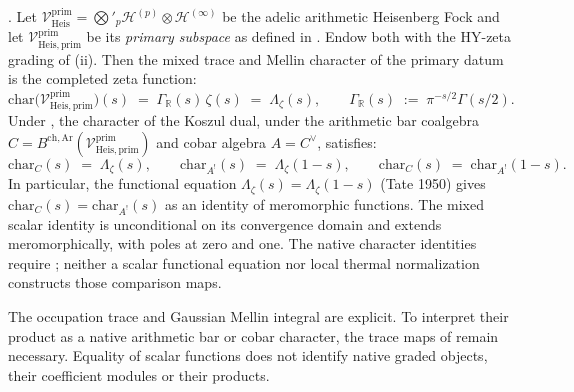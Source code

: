 \begin{theorem}
\label{v4-arith:prim-zeta:thm:main}
\ClaimStatusProvedHere. Let
\(\mathcal{V}^{\mathrm{prim}}_{\mathrm{Heis}}=\bigotimes'_{p}\mathcal{H}^{(p)}\otimes\mathcal{H}^{(\infty)}\)
be the adelic arithmetic Heisenberg Fock and let
\(\mathcal{V}^{\mathrm{prim}}_{\mathrm{Heis},\mathrm{prim}}\) be its
\emph{primary subspace} as defined in
. Endow both with the
HY-zeta grading of
(ii). Then the mixed trace and Mellin character of
the primary datum is the completed zeta function:
\begin{equation}
\label{v4-arith:prim-zeta:eq:main}
\mathrm{char}\bigl(\mathcal{V}^{\mathrm{prim}}_{\mathrm{Heis},\mathrm{prim}}\bigr)(s)
\;=\;\Gamma_{\mathbb{R}}(s)\,\zeta(s)
\;=\;\Lambda_{\zeta}(s),
\qquad
\Gamma_{\mathbb{R}}(s)\;:=\;\pi^{-s/2}\Gamma(s/2).
\end{equation}
Under , the
character of the Koszul dual, under the arithmetic bar
coalgebra \(C=B^{\mathrm{ch,Ar}}(\mathcal{V}^{\mathrm{prim}}_{\mathrm{Heis},\mathrm{prim}})\)
and cobar algebra \(A=C^{\vee}\), satisfies:
\begin{equation}
\label{v4-arith:prim-zeta:eq:koszul-dual}
\mathrm{char}_{C}(s)\;=\;\Lambda_{\zeta}(s),
\qquad
\mathrm{char}_{A^{!}}(s)\;=\;\Lambda_{\zeta}(1-s),
\qquad
\mathrm{char}_{C}(s)\;=\;\mathrm{char}_{A^{!}}(1-s).
\end{equation}
In particular, the functional equation
\(\Lambda_{\zeta}(s)=\Lambda_{\zeta}(1-s)\) (Tate 1950)
gives \(\mathrm{char}_{C}(s)=\mathrm{char}_{A^{!}}(s)\) as an identity
of meromorphic functions.
The mixed scalar identity is unconditional on its convergence domain
and extends meromorphically, with poles at zero and one. The native
character identities require
; neither a scalar
functional equation nor local thermal normalization constructs those
comparison maps.
\end{theorem}

\begin{remark}
\label{v4-arith:prim-zeta:rem:domain}
The occupation trace and Gaussian Mellin integral are explicit. To
interpret their product as a native arithmetic bar or cobar character,
the trace maps of 
remain necessary. Equality of scalar functions does not identify
native graded objects, their coefficient modules or their products.
\end{remark}

